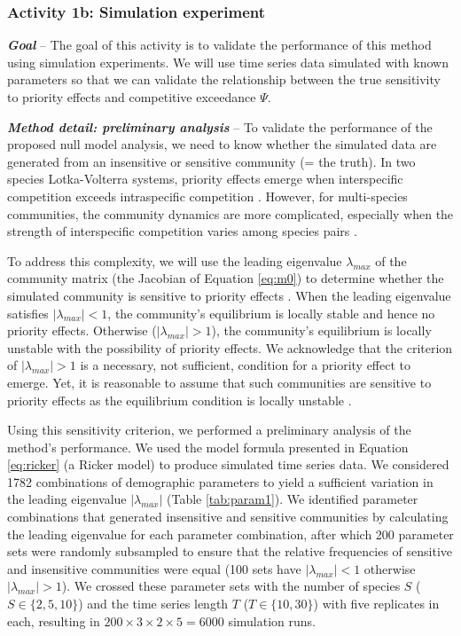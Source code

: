 \documentclass[12pt, class=article, crop=false]{standalone}
\begin{document}
\subsubsection*{Activity 1b: Simulation experiment}

\textbf{\textit{Goal}} -- 
The goal of this activity is to validate the performance of this method using simulation experiments.
We will use time series data simulated with known parameters so that we can validate the relationship between the true sensitivity to priority effects and competitive exceedance $\Psi$.

\textbf{\textit{Method detail: preliminary analysis}} -- 
To validate the performance of the proposed null model analysis, we need to know whether the simulated data are generated from an insensitive or sensitive community (= the truth).
In two species Lotka-Volterra systems, priority effects emerge when interspecific competition exceeds intraspecific competition \citep{ke_coexistence_2018}.
However, for multi-species communities, the community dynamics are more complicated, especially when the strength of interspecific competition varies among species pairs \citep{carroll_niche_2011, barabas_chessons_2018}.

To address this complexity, we will use the leading eigenvalue $\lambda_{max}$ of the community matrix (the Jacobian of Equation \ref{eq:m0}) to determine whether the simulated community is sensitive to priority effects \citep{otto_biologists_2011}.
When the leading eigenvalue satisfies $|\lambda_{max}| < 1$, the community's equilibrium is locally stable and hence no priority effects.
Otherwise ($|\lambda_{max}| > 1$), the community's equilibrium is locally unstable with the possibility of priority effects.
We acknowledge that the criterion of $|\lambda_{max}| > 1$ is a necessary, not sufficient, condition for a priority effect to emerge.
Yet, it is reasonable to assume that such communities are sensitive to priority effects as the equilibrium condition is locally unstable  \citep{otto_biologists_2011}. 

Using this sensitivity criterion, we performed a preliminary analysis of the method's performance.
We used the model formula presented in Equation \ref{eq:ricker} (a Ricker model) to produce simulated time series data.
We considered 1782 combinations of demographic parameters to yield a sufficient variation in the leading eigenvalue $|\lambda_{max}|$ (Table \ref{tab:param1}).
We identified parameter combinations that generated insensitive and sensitive communities by calculating the leading eigenvalue for each parameter combination, after which 200 parameter sets were randomly subsampled to ensure that the relative frequencies of sensitive and insensitive communities were equal (100 sets have $|\lambda_{max}| < 1$ otherwise $|\lambda_{max}| > 1$).
We crossed these parameter sets with the number of species $S$ ($S \in \{2, 5, 10\}$) and the time series length $T$ ($T \in \{10, 30\}$) with five replicates in each, resulting in $200 \times 3 \times 2 \times 5 = 6000$ simulation runs.
\end{document}
